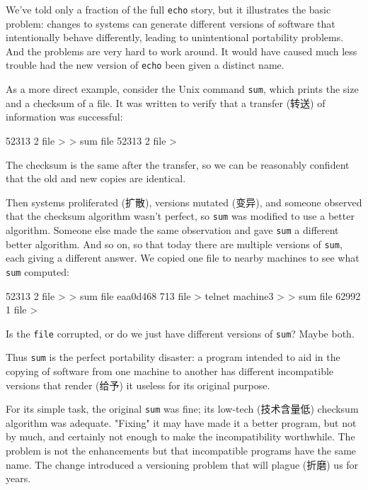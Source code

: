We've told only a fraction of the full \verb'echo' story, but it
illustrates the basic problem: changes to systems can generate different
versions of software that intentionally behave differently, leading to
unintentional portability problems. And the problems are very hard to work
around. It would have caused much less trouble had the new version of
\verb'echo' been given a distinct name.

As a more direct example, consider the Unix command \verb'sum', which
prints the size and a checksum of a file. It was written to verify that a
transfer (转送) of information was successful:
\begin{wellcode}
    52313 2 file
    >
    > sum file
    52313 2 file
    >
\end{wellcode}
The checksum is the same after the transfer, so we can be reasonably
confident that the old and new copies are identical.

Then systems proliferated (扩散), versions mutated (变异), and someone
observed that the checksum algorithm wasn't perfect, so \verb'sum' was
modified to use a better algorithm.  Someone else made the same observation
and gave \verb'sum' a different better algorithm.  And so on, so that today
there are multiple versions of \verb'sum', each giving a different answer.
We copied one file to nearby machines to see what \verb'sum' computed:
\begin{wellcode}
    52313 2 file
    >
    > sum file
    eaa0d468 713 file
    > telnet  machine3
    >
    > sum file
    62992 1 file
    >
\end{wellcode}
Is the \verb'file' corrupted, or do we just have different versions of
\verb'sum'? Maybe both.

Thus \verb'sum' is the perfect portability disaster: a program intended to
aid in the copying of software from one machine to another has different
incompatible versions that render (给予) it useless for its original
purpose.

For its simple task, the original \verb'sum' was fine; its low-tech
(技术含量低) checksum algorithm was adequate. "Fixing" it may have made it
a better program, but not by much, and certainly not enough to make the
incompatibility worthwhile. The problem is not the enhancements but that
incompatible programs have the same name. The change introduced a
versioning problem that will plague (折磨) us for years.

